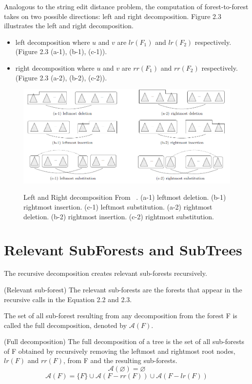 Analogous to the string edit distance problem, the computation of forest-to-forest takes on two possible directions: left and right decomposition. Figure 2.3 illustrates the left and right decomposition.
\begin{itemize}
\item left decomposition where $u$ and $v$ are $lr(F_1)$ and $lr(F_2)$ respectively.(Figure 2.3 (a-1), (b-1), (c-1)).
\item right decomposition where $u$ and $v$ are $rr(F_1)$ and $rr(F_2)$ respectively.(Figure 2.3 (a-2), (b-2), (c-2)).
\end{itemize}

\begin{figure}
		\centering
		\includegraphics[width=16cm,clip]{Figures/LeftRightDecomposition}
		\label{Left and Right Recursive composition} 
		\caption{Left and Right decomposition From ~\cite{Chen2014}. (a-1) leftmost deletion. (b-1) rightmost insertion. (c-1) leftmost substitution. (a-2) rightmost deletion. (b-2) rightmost insertion. (c-2) rightmost substitution.}
\end{figure}

\section{Relevant SubForests and SubTrees}
The recursive decomposition creates relevant sub-forests recursively. 

\begin{definition}
(Relevant sub-forest)
The relevant sub-forests are the forests that appear in the recursive calls in the Equation 2.2 and 2.3. 
\end{definition}

The set of all sub-forest resulting from any decomposition from the forest F is called the full decomposition, denoted by $\mathcal{A}(F)$.

\begin{definition}
(Full decomposition)
The full decomposition of a tree is the set of all sub-forests of F obtained by recursively removing the leftmost and rightmost root nodes, $lr(F)$ and $rr(F)$, from F and the resulting sub-forests. 
\begin{equation*}
\mathcal{A}(\varnothing) = \varnothing
\end{equation*}
\begin{equation*}
\mathcal{A}(F) = \{F\} \cup \mathcal{A}(F - rr(F)) \cup \mathcal{A}(F - lr(F))
\end{equation*}
\end{definition}

